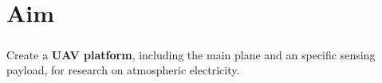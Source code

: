 \chapter{Aim}
\paragraph{} Create a \textbf{UAV platform}, including the main plane and an specific sensing payload, for research on atmospheric electricity. 

